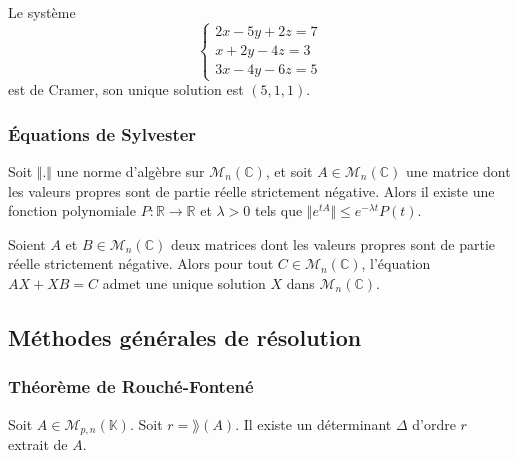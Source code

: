   \begin{example}
    Le système
    \[
      \begin{cases}
        2x - 5y + 2z = 7 \\
        x + 2y - 4z = 3 \\
        3x - 4y - 6z = 5
      \end{cases}
    \]
    est de Cramer, son unique solution est $(5,1,1)$.
  \end{example}

  \subsubsection{Équations de Sylvester}


  \begin{lemma}
    Soit $\Vert . \Vert$ une norme d'algèbre sur $\mathcal{M}_n(\mathbb{C})$, et soit $A \in \mathcal{M}_n(\mathbb{C})$ une matrice dont les valeurs propres sont de partie réelle strictement négative. Alors il existe une fonction polynomiale $P : \mathbb{R} \rightarrow \mathbb{R}$ et $\lambda > 0$ tels que $\Vert e^{tA} \Vert \leq e^{- \lambda t} P(t)$.
  \end{lemma}


  \begin{application}
    Soient $A$ et $B \in \mathcal{M}_n(\mathbb{C})$ deux matrices dont les valeurs propres sont de partie réelle strictement négative. Alors pour tout $C \in \mathcal{M}_n(\mathbb{C})$, l'équation $AX + XB = C$ admet une unique solution $X$ dans $\mathcal{M}_n(\mathbb{C})$.
  \end{application}

  \subsection{Méthodes générales de résolution}

  \subsubsection{Théorème de Rouché-Fontené}


  \begin{lemma}
    Soit $A \in \mathcal{M}_{p,n}(\mathbb{K})$. Soit $r = \rang(A)$. Il existe un déterminant $\Delta$ d'ordre $r$ extrait de $A$.
  \end{lemma}

